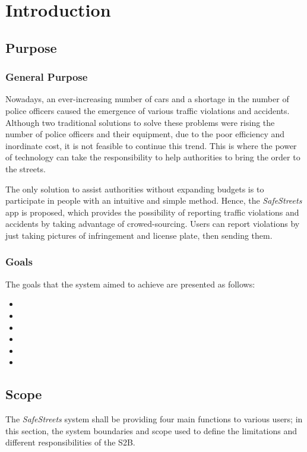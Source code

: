 \section{Introduction}

\subsection{Purpose}
\subsubsection{General Purpose}
Nowadays, an ever-increasing number of cars and a shortage in the number of police officers caused the emergence of various traffic violations and accidents. Although two traditional solutions to solve these problems were rising the number of police officers and their equipment, due to the poor efficiency and inordinate cost, it is not feasible to continue this trend. This is where the power of technology can take the responsibility to help authorities to bring the order to the streets.

The only solution to assist authorities without expanding budgets is to participate in people with an intuitive and simple method. Hence, the \emph{SafeStreets} app is proposed, which provides the possibility of reporting traffic violations and accidents by taking advantage of crowed-sourcing. Users can report violations by just taking pictures of infringement and license plate, then sending them.
\subsubsection{Goals}
The goals that the system aimed to achieve are presented as follows:
\begin{itemize}
\item  {}
\item  {}
\item  {}
\item  {}
\item  {}
\item  {}
\end{itemize}

\subsection{Scope}
The \emph{SafeStreets} system shall be providing four main functions to various users; in this section, the system boundaries and scope used to define the limitations and different responsibilities of the S2B. 

